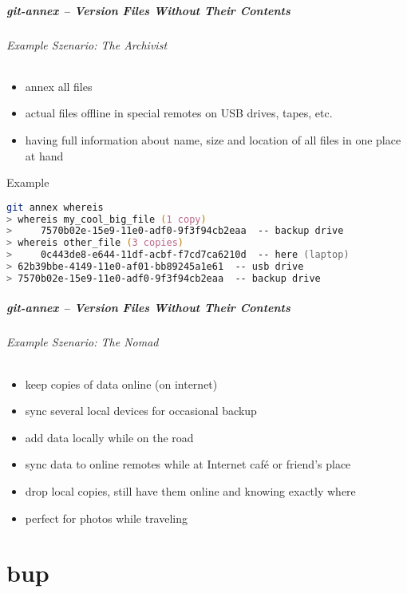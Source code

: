 \documentclass[english,hyperref={pdfpagelabels=false},aspectratio=169]{beamer}
\begin{document}
\begin{frame}[fragile]
  \frametitle{git-annex -- Version Files Without Their Contents}
  \framesubtitle{Example Szenario: The Archivist}
  \begin{itemize}
    \item annex all files
    \item actual files offline in special remotes on USB drives, tapes, etc.
    \item having full information about name, size and location of all files in one place at hand
  \end{itemize}
  
  \begin{block}{Example}
    \vspace{-0.75em}
    \begin{lstlisting}[language=zsh]
git annex whereis
> whereis my_cool_big_file (1 copy)
>     7570b02e-15e9-11e0-adf0-9f3f94cb2eaa  -- backup drive
> whereis other_file (3 copies)
>     0c443de8-e644-11df-acbf-f7cd7ca6210d  -- here (laptop)
> 62b39bbe-4149-11e0-af01-bb89245a1e61  -- usb drive
> 7570b02e-15e9-11e0-adf0-9f3f94cb2eaa  -- backup drive
    \end{lstlisting}
    \vspace{-0.75em}
  \end{block}
\end{frame}

\begin{frame}
  \frametitle{git-annex -- Version Files Without Their Contents}
  \framesubtitle{Example Szenario: The Nomad}
  \begin{itemize}
    \item keep copies of data online (on internet)
    \item sync several local devices for occasional backup
    \item add data locally while on the road
    \item sync data to online remotes while at Internet café or friend's place
    \item drop local copies, still have them online and knowing exactly where
    \item perfect for photos while traveling
  \end{itemize}
\end{frame}



\part{bup}
\makepart
\end{document}
